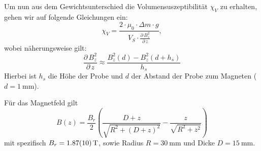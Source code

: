 \documentclass[11pt,a4paper,titlepage, ngerman]{article}
\begin{document}
			Um nun aus dem Gewichtsunterschied die Volumensuszeptibilität $\chi _V$ zu erhalten, gehen wir auf folgende Gleichungen ein:
			\begin{equation}
				\chi_V = \frac{2 \cdot \mu_0 \cdot \Delta m \cdot g}{V_S \cdot \frac{\partial\,B^2_z}{\partial\,z}}, \label{eq:Volumensusz.}
			\end{equation}
			wobei näherungsweise gilt:
			\begin{equation}
				\frac{\partial\,B^2_z}{\partial\,z} \approx \frac{B_z^2(d) - B_z^2(d+h_s)}{h_s}
			\end{equation}
			Hierbei ist $h_s$ die Höhe der Probe und $d$ der Abstand der Probe zum Magneten ($d = \SI{1}{\mm}$).
			
			Für das Magnetfeld gilt
			\begin{equation}
			B(z) = \frac{B_r}{2}\left( \frac{D+z}{\sqrt{R^2 + (D+z)^2}} - \frac{z}{\sqrt{R^2 + z^2}}\right)
			\end{equation}
			mit spezifisch $B_r = \SI{1,87+-0,1}{T}$, sowie Radius $R = \SI{30}{\milli\meter}$ und Dicke $D = \SI{15}{\milli\meter}$.
			
\end{document}
